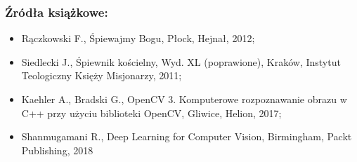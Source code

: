 \documentclass[a4paper,12pt]{article}
\begin{document}
	   \subsubsection*{Źródła książkowe:}
	   \begin{spacing}{1.5}
	   \begin{itemize}
	        \item Rączkowski F., Śpiewajmy Bogu, Płock, Hejnał, 2012;
	        \item Siedlecki J., Śpiewnik kościelny, Wyd. XL (poprawione), Kraków,
	        Instytut Teologiczny Księży Misjonarzy, 2011;
	        \item Kaehler A., Bradski G., OpenCV 3. Komputerowe rozpoznawanie obrazu w C++ przy użyciu biblioteki OpenCV, Gliwice, Helion, 2017;
	        \item Shanmugamani R., Deep Learning for Computer Vision, Birmingham, Packt Publishing, 2018
	   \end{itemize}
	   \end{spacing}
	   
\end{document}
